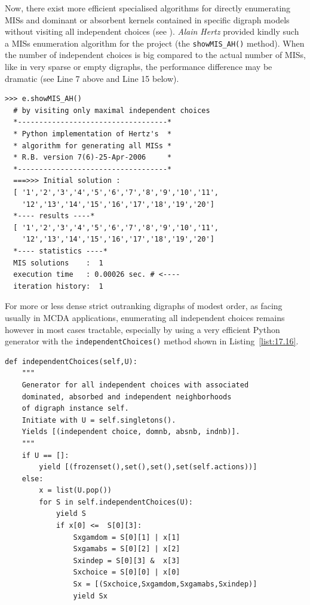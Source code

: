 Now, there exist more efficient specialised algorithms for directly enumerating MISs and dominant or absorbent kernels contained in specific digraph models without visiting all independent choices (see \citep{BIS-2006b}). \emph{Alain Hertz} provided kindly such a MISs enumeration algorithm for the \Digraph project (the \texttt{showMIS\_AH()} method). When the number of independent choices is big compared to the actual number of MISs, like in very sparse or empty digraphs, the performance difference may be dramatic (see Line 7 above and Line 15 below).
\begin{lstlisting}[caption={Enumerating MISs by visiting only maximal independent choices (\emph{A. Hertz}) },label=list:17.15]
>>> e.showMIS_AH()
  # by visiting only maximal independent choices
  *-----------------------------------*
  * Python implementation of Hertz's  *
  * algorithm for generating all MISs *
  * R.B. version 7(6)-25-Apr-2006     *
  *-----------------------------------*
  ===>>> Initial solution :
  [ '1','2','3','4','5','6','7','8','9','10','11',
    '12','13','14','15','16','17','18','19','20']
  *---- results ----*
  [ '1','2','3','4','5','6','7','8','9','10','11',
    '12','13','14','15','16','17','18','19','20']
  *---- statistics ----*
  MIS solutions    :  1
  execution time   : 0.00026 sec. # <----
  iteration history:  1
\end{lstlisting}

For more or less dense strict outranking digraphs of modest order, as facing usually in MCDA applications, enumerating all independent choices remains however in most cases tractable, especially by using a very efficient Python generator with the \texttt{independentChoices()} method shown in Listing~\vref{list:17.16}.
\begin{lstlisting}[caption={Generating all independent choices in a digraph},label=list:17.16]
def independentChoices(self,U):
    """
    Generator for all independent choices with associated
    dominated, absorbed and independent neighborhoods
    of digraph instance self.
    Initiate with U = self.singletons().
    Yields [(independent choice, domnb, absnb, indnb)].
    """
    if U == []:
        yield [(frozenset(),set(),set(),set(self.actions))]
    else:
        x = list(U.pop())
        for S in self.independentChoices(U):
            yield S
            if x[0] <=  S[0][3]:
                Sxgamdom = S[0][1] | x[1]
                Sxgamabs = S[0][2] | x[2]
                Sxindep = S[0][3] &  x[3]
                Sxchoice = S[0][0] | x[0]
                Sx = [(Sxchoice,Sxgamdom,Sxgamabs,Sxindep)]
                yield Sx
\end{lstlisting}

